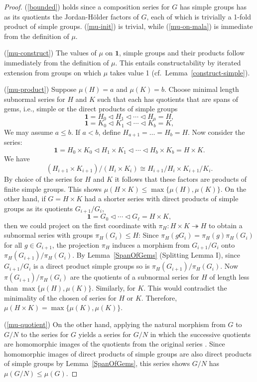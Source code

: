 \documentclass[a4paper,11pt]{amsart}
\theoremstyle{definition}
\newcommand{\sur}{\twoheadrightarrow}
\newcommand{\1}{{\mathbf 1}}
\begin{document}
\begin{proof}
(\ref{bounded}) holds since a composition series for $G$ has simple groups has as its quotients the Jordan-Hölder factors of $G$, each of which is trivially a 1-fold product of simple groups. 
(\ref{mu-init}) is trivial, while  (\ref{mu-on-mala}) is immediate from the definition of $\mu$.  

(\ref{mu-construct}) The values of $\mu$ on $\1$, simple groups and their products follow immediately from the definition of $\mu$. This entails constructability by iterated extension from groups on which $\mu$ takes value 1 (cf.\ Lemma~\ref{construct-simple}).


(\ref{mu-product})  Suppose $\mu(H)=a$ and $\mu(K)=b$.
Choose minimal length subnormal series for $H$ and $K$ such that each has quotients that are  spans of gems, i.e., simple or the direct products of simple groups 
$$\1 =H_0 \lhd H_1 \lhd \cdots \lhd H_{a} =H,$$
$$\1 =K_0 \lhd K_1 \lhd \cdots \lhd K_{b} =K,$$
We may assume $a \leq b$.  If $a < b$, define $H_{a+1}= \ldots = H_{b}=H$.     
Now consider the series:
$$\1 =H_0 \times K_0 \lhd H_1 \times K_1 \lhd \cdots \lhd H_{b} \times K_{b}= H \times K.$$
We have $$(H_{i+1}\times K_{i+1}) / (H_i \times K_i) \cong 
H_{i+1} / H_i \times K_{i+1} / K_i .$$  By choice of the series for $H$ and $K$ it follows that these factors are products of finite simple groups.   This shows $\mu(H\times K) \leq \max\{ \mu(H), \mu(K)\}$.
On the other hand, if $G=H\times K$ had a shorter series with direct products of simple groups as its quotients $G_{i+1}/G_i$,
$$\1=G_0 \lhd \cdots \lhd G_\ell=H\times K,$$ then
we could project on the first coordinate with $\pi_H: H\times K \sur H$ to obtain a subnormal series with groups $\pi_H(G_i) \leq H$: Since $\pi_H(gG_i)=\pi_H(g)\pi_H(G_i)$ for all $g\in G_{i+1}$, the projection $\pi_H$ induces a morphism from $G_{i+1}/G_i$ onto $\pi_H(G_{i+1})/\pi_H(G_i)$. By Lemma~\ref{SpanOfGems} (Splitting Lemma I), since $G_{i+1}/G_i$
is a direct product simple groups so is $\pi_H(G_{i+1})/\pi_H(G_i)$.
Now $\pi(G_{i+1})/\pi_H(G_i)$ are the quotients of a subnormal series for $H$ of length less than $\max\{\mu(H),\mu(K)\}$. Similarly, for  $K$. This would contradict the minimality of the chosen of series for $H$ or $K$.  Therefore,
$\mu(H\times K) = \max\{ \mu(K), \mu(K)\}$.


(\ref{mu-quotient})
On the other hand,  applying the natural morphism from $G$ to $G/N$ to the series for $G$ yields a series for $G/N$ in which the successive quotients are homomorphic images of the quotients from the original series \cite[pp. 102-3, first part of proof of Theorem 5.16]{Rotman}. Since homomorphic images of direct products of simple groups are also direct products of simple groups by Lemma~\ref{SpanOfGems}, this series shows $G/N$ has $\mu(G/N) \leq \mu(G)$. 



\end{proof}
\end{document}

